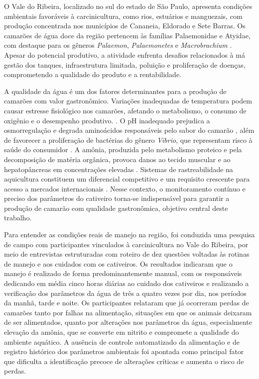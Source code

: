 \documentclass[11pt,a4paper]{article}
\begin{document}
O Vale do Ribeira, localizado no sul do estado de São Paulo, apresenta condições ambientais favoráveis à carcinicultura, como rios, estuários e manguezais, com produção concentrada nos municípios de Cananeia, Eldorado e Sete Barras. Os camarões de água doce da região pertencem às famílias Palaemonidae e Atyidae, com destaque para os gêneros \textit{Palaemon}, \textit{Palaemonetes} e \textit{Macrobrachium} \cite{bertini2021}. Apesar do potencial produtivo, a atividade enfrenta desafios relacionados à má gestão dos tanques, infraestrutura limitada, poluição e proliferação de doenças, comprometendo a qualidade do produto e a rentabilidade.

A qualidade da água é um dos fatores determinantes para a produção de camarões com valor gastronômico. Variações inadequadas de temperatura podem causar estresse fisiológico nos camarões, afetando o metabolismo, o consumo de oxigênio e o desempenho produtivo. \cite{praciano2018}. O pH inadequado prejudica a osmorregulação e degrada aminoácidos responsáveis pelo sabor do camarão \cite{Hsieh2021}, além de favorecer a proliferação de bactérias do gênero \textit{Vibrio}, que representam risco à saúde do consumidor \cite{han2025}. A amônia, produzida pelo metabolismo proteico e pela decomposição de matéria orgânica, provoca danos ao tecido muscular e ao hepatopâncreas em concentrações elevadas \cite{han2025}. Sistemas de rastreabilidade na aquicultura constituem um diferencial competitivo e um requisito crescente para acesso a mercados internacionais \cite{UniversoSaudeAnimal2025}. Nesse contexto, o monitoramento contínuo e preciso dos parâmetros do cativeiro torna-se indispensável para garantir a produção de camarão com qualidade gastronômica, objetivo central deste trabalho.

Para entender as condições reais de manejo na região, foi conduzida uma pesquisa de campo com participantes vinculados à carcinicultura no Vale do Ribeira, por meio de entrevistas estruturadas com roteiro de dez questões voltadas às rotinas de manejo e aos cuidados com os cativeiros. Os resultados indicaram que o manejo é realizado de forma predominantemente manual, com os responsáveis dedicando em média cinco horas diárias ao cuidado dos cativeiros e realizando a verificação dos parâmetros da água de três a quatro vezes por dia, nos períodos da manhã, tarde e noite. Os participantes relataram que já ocorreram perdas de camarões tanto por falhas na alimentação, situações em que os animais deixaram de ser alimentados, quanto por alterações nos parâmetros da água, especialmente elevação da amônia, que se converte em nitrito e compromete a qualidade do ambiente aquático. A ausência de controle automatizado da alimentação e de registro histórico dos parâmetros ambientais foi apontada como principal fator que dificulta a identificação precoce de alterações críticas e aumenta o risco de perdas.
\end{document}
